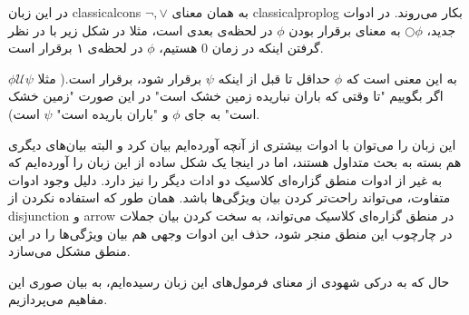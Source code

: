 در این زبان \glspl*{classicalcon}
$\neg, \lor$
به همان معنای \gls*{classicalproplog} بکار می‌روند.  
در ادوات جدید، 
$\bigcirc \phi$
به معنای برقرار بودن $\phi$ در لحظه‌ی بعدی است، مثلا در شکل زیر با در نظر گرفتن اینکه در زمان 0 هستیم، $\phi$ در لحظه‌ی ۱ برقرار است.
	\begin{center}
\end{center}
$\phi \mathcal{U}\psi$
به این معنی است که $\phi$ حداقل تا قبل از اینکه $\psi$ برقرار شود، برقرار است.( مثلا اگر بگوییم "تا وقتی که باران نباریده زمین خشک است" در این صورت "زمین خشک است" به جای $\phi$ و "باران باریده است" $\psi$ است).
\begin{center}
\end{center}

این زبان را می‌توان با ادوات بیشتری از آنچه آورده‌ایم بیان کرد و البته بیان‌های دیگری هم بسته به بحث متداول هستند، اما در اینجا یک شکل ساده از این زبان را آورده‌ایم که به غیر از ادوات منطق گزاره‌ای کلاسیک دو ادات دیگر را نیز دارد. دلیل وجود ادوات متفاوت، می‌تواند راحت‌تر کردن بیان ویژگی‌ها باشد. همان طور که استفاده نکردن از \gls*{disjunction} و \gls*{arrow} در منطق گزاره‌ای کلاسیک می‌تواند، به سخت کردن بیان جملات در چارچوب این منطق منجر شود، حذف این ادوات وجهی هم بیان ویژگی‌ها را در این منطق مشکل می‌سازد. 

حال که به درکی شهودی از معنای فرمول‌های این زبان رسیده‌ایم، به بیان صوری این مفاهیم می‌پردازیم.

